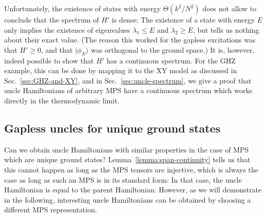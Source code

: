 \documentclass[cmp]{svjour}
\newcommand{\ket}[1]{|#1\rangle}
\begin{document}
Unfortunately, the existence of states with energy $\Theta(k^2/N^2)$ does
not allow to conclude that the spectrum of $H'$ is dense: The existence
of a state with energy $E$ only implies the existence of eigenvalues
$\lambda_1\le E$ and $\lambda_2\ge E$, but tells us nothing about their
exact value. (The reason this worked for the gapless excitations was that
$H'\ge0$, and that $\ket{\phi_N}$ was orthogonal to the ground space.)
It is, however, indeed possible to show that $H'$ has a continuous
spectrum.  For the GHZ example, this can be done by mapping it to the XY
model as discussed in Sec.~\ref{sec:GHZ-and-XY}, and in Sec.~\ref{sec:uncle-spectrum}, we give a
proof that uncle Hamiltonians of arbitrary MPS have a continuous spectrum
which works directly in the thermodynamic limit.










\subsection{Gapless uncles for unique ground
    states\label{sec:uncle-for-000}}

Can we obtain uncle Hamiltonians with similar properties in the case of
MPS which are unique ground states? Lemma~\ref{lemma:span-continuity}
tells us that this cannot happen as long as the MPS tensors are injective,
which is always the case as long as such an MPS is in its standard form:
In that case, the uncle Hamiltonian is equal to the parent Hamiltonian.
However, as we will demonstrate in the following, interesting uncle
Hamiltonians can be obtained by choosing a different MPS representation.
\end{document}
